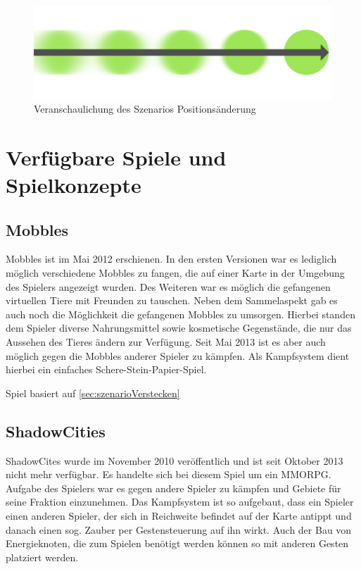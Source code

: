 \begin{figure}[h]
    \centering
    \includegraphics[width=.8\textwidth]{files/lbgArten/changeOfDistance}
    \caption{Veranschaulichung des Szenarios Positionsänderung}
    \label{szenD}
\end{figure}

\section{Verfügbare Spiele und Spielkonzepte} 

\subsection{Mobbles} 
Mobbles ist im Mai 2012 erschienen. In den ersten Versionen war es lediglich möglich verschiedene Mobbles zu fangen, die auf einer Karte in der Umgebung des Spielers angezeigt wurden. Des Weiteren war es möglich die gefangenen virtuellen Tiere mit Freunden zu tauschen. Neben dem Sammelaspekt gab es auch noch die Möglichkeit die gefangenen Mobbles zu umsorgen. Hierbei standen dem Spieler diverse Nahrungsmittel sowie kosmetische Gegenstände, die nur das Aussehen des Tieres ändern zur Verfügung. Seit Mai 2013 ist es aber auch möglich gegen die Mobbles anderer Spieler zu kämpfen. Als Kampfsystem dient hierbei ein einfaches Schere-Stein-Papier-Spiel.  

Spiel basiert auf \ref{sec:szenarioVerstecken}

\subsection{ShadowCities} 
ShadowCites wurde im November 2010 veröffentlich und ist seit Oktober 2013 nicht mehr verfügbar. Es handelte sich bei diesem Spiel um ein MMORPG. Aufgabe des Spielers war es gegen andere Spieler zu kämpfen und Gebiete für seine Fraktion einzunehmen. Das Kampfsystem ist so aufgebaut, dass ein Spieler einen anderen Spieler, der sich in Reichweite befindet auf der Karte antippt und danach einen sog. Zauber per Gestensteuerung auf ihn wirkt. Auch der Bau von Energieknoten, die zum Spielen benötigt werden können so mit anderen Gesten platziert werden. 

